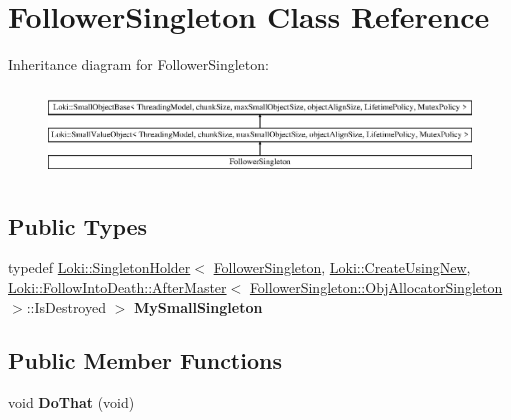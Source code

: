 \hypertarget{classFollowerSingleton}{}\section{Follower\+Singleton Class Reference}
\label{classFollowerSingleton}
Inheritance diagram for Follower\+Singleton\+:\begin{figure}[H]
\begin{center}
\leavevmode
\includegraphics[height=2.349650cm]{classFollowerSingleton}
\end{center}
\end{figure}
\subsection*{Public Types}
\begin{DoxyCompactItemize}
\item 
\hypertarget{classFollowerSingleton_a983d56ac56fe76a13275da3b8fcd4857}{}typedef \hyperlink{classLoki_1_1SingletonHolder}{Loki\+::\+Singleton\+Holder}$<$ \hyperlink{classFollowerSingleton}{Follower\+Singleton}, \hyperlink{structLoki_1_1CreateUsingNew}{Loki\+::\+Create\+Using\+New}, \hyperlink{structLoki_1_1FollowIntoDeath_1_1AfterMaster}{Loki\+::\+Follow\+Into\+Death\+::\+After\+Master}$<$ \hyperlink{classLoki_1_1SmallObjectBase_ad07df1c9ec9c41580e07e32eddcda82d}{Follower\+Singleton\+::\+Obj\+Allocator\+Singleton} $>$\+::Is\+Destroyed $>$ {\bfseries My\+Small\+Singleton}\label{classFollowerSingleton_a983d56ac56fe76a13275da3b8fcd4857}

\end{DoxyCompactItemize}
\subsection*{Public Member Functions}
\begin{DoxyCompactItemize}
\item 
\hypertarget{classFollowerSingleton_a46f6c54b7598c6a5031ea2f9f9e22476}{}void {\bfseries Do\+That} (void)\label{classFollowerSingleton_a46f6c54b7598c6a5031ea2f9f9e22476}

\end{DoxyCompactItemize}
